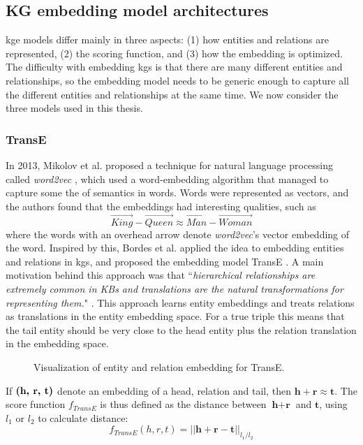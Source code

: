 \subsection{KG embedding model architectures}
\label{KG_embeddings_section}
\gls{kge} models differ mainly in three aspects: (1) how entities and relations are represented, (2) the scoring function, and (3) how the embedding is optimized. The difficulty with embedding \glspl{kg} is that there are many different entities and relationships, so the embedding model needs to be generic enough to capture all the different entities and relationships at the same time. We now consider the three models used in this thesis.

\subsubsection{TransE}
\label{TransE_peaked_in_2013}
In 2013, Mikolov et al. proposed a technique for natural language processing called \textit{word2vec} \cite{mikolov2013distributed,mikolov2013efficient}, which used a word-embedding algorithm that managed to capture some the of semantics in words. Words were represented as vectors, and the authors found that the embeddings had interesting qualities, such as
\[\overrightarrow{King} - \overrightarrow{Queen} \approx \overrightarrow{Man} -\overrightarrow{Woman}\]
where the words with an overhead arrow denote \textit{word2vec}'s vector embedding of the word. Inspired by this, Bordes et al. applied the idea to embedding entities and relations in \glspl{kg}, and proposed the embedding model TransE \cite{TransE}. A main motivation behind this approach was that ``\textit{hierarchical relationships are extremely common in KBs and translations are the natural transformations for representing them.}" \cite{TransE}. This approach learns entity embeddings and treats relations as translations in the entity embedding space.  For a true triple this means that the tail entity should be very close to the head entity plus the relation translation in the embedding space. 

\begin{figure}[htp]
    \centering
    
    \caption[TransE embedding.]{Visualization of entity and relation embedding for TransE.}
    \label{IKEA_TransE}
\end{figure}

If $\text{\textbf{(h, r, t)}}$ denote an embedding of a head, relation and tail, then $\textbf{h} + \textbf{r} \approx \textbf{t}$. The score function $f_{TransE}$ is thus defined as the distance between $\textbf{h} + \textbf{r}$ and $\textbf{t}$, using $l_1$ or $l_2$ to calculate distance:
\[f_{TransE}(h, r, t) = ||\textbf{h} + \textbf{r} - \textbf{t}||_{l_1/l_2}\]

